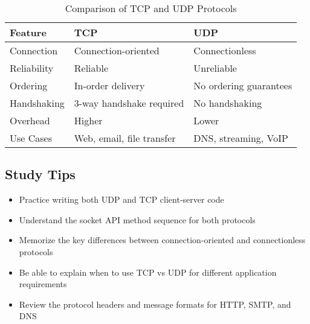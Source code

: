 \documentclass[12pt]{article}
\begin{document}
\begin{table}[h]
    \centering
    \begin{tabular}{|l|l|l|}
        \hline
        \textbf{Feature} & \textbf{TCP}              & \textbf{UDP}           \\
        \hline
        Connection       & Connection-oriented       & Connectionless         \\
        Reliability      & Reliable                  & Unreliable             \\
        Ordering         & In-order delivery         & No ordering guarantees \\
        Handshaking      & 3-way handshake required  & No handshaking         \\
        Overhead         & Higher                    & Lower                  \\
        Use Cases        & Web, email, file transfer & DNS, streaming, VoIP   \\
        \hline
    \end{tabular}
    \caption{Comparison of TCP and UDP Protocols}
\end{table}

\subsection*{Study Tips}

\begin{itemize}
    \item Practice writing both UDP and TCP client-server code
    \item Understand the socket API method sequence for both protocols
    \item Memorize the key differences between connection-oriented and connectionless protocols
    \item Be able to explain when to use TCP vs UDP for different application requirements
    \item Review the protocol headers and message formats for HTTP, SMTP, and DNS
\end{itemize}
\end{document}

